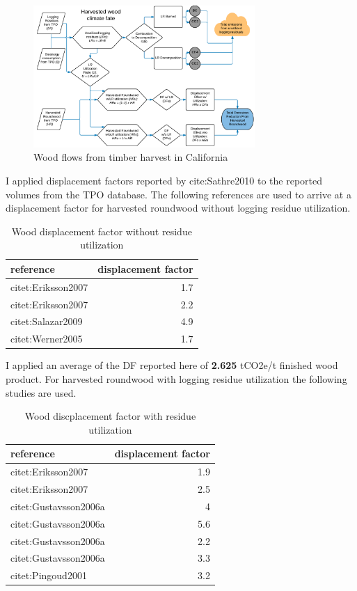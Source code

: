 \documentclass[a4paper]{article}
\begin{document}
\begin{figure}[htb]
\centering
\includegraphics[width=0.75\textwidth]{./graphics/flow_chart.pdf}
\caption{Wood flows from timber harvest in California \label{fig:flow_chart}}
\end{figure}


I applied displacement factors reported by cite:Sathre2010 to the
reported volumes from the TPO database. The following references are used to
arrive at a displacement factor for harvested roundwood without
logging residue utilization.

\begin{table}[htb]
\caption{Wood displacement factor without residue utilization}
\centering
\begin{tabular}{lr}
reference & displacement factor\\
\hline
citet:Eriksson2007 & 1.7\\
citet:Eriksson2007 & 2.2\\
citet:Salazar2009 & 4.9\\
citet:Werner2005 & 1.7\\
\end{tabular}
\end{table}

I applied an average of the DF reported here of \textbf{2.625} tCO2e/t finished
wood product. For harvested roundwood with logging residue utilization the following
studies are used.

\begin{table}[htb]
\caption{Wood discplacement factor with residue utilization}
\centering
\begin{tabular}{lr}
reference & displacement factor\\
\hline
citet:Eriksson2007 & 1.9\\
citet:Eriksson2007 & 2.5\\
citet:Gustavsson2006a & 4\\
citet:Gustavsson2006a & 5.6\\
citet:Gustavsson2006a & 2.2\\
citet:Gustavsson2006a & 3.3\\
citet:Pingoud2001 & 3.2\\
\end{tabular}
\end{table}
\end{document}
